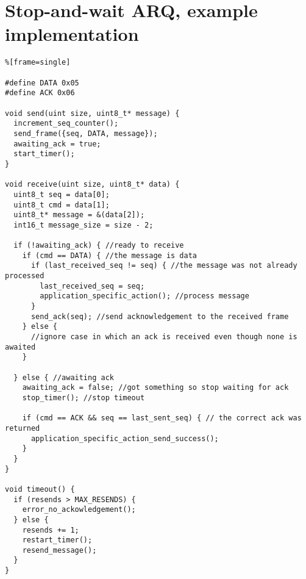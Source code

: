 \documentclass[10pt,a4paper]{article}
\begin{document}
\section{Stop-and-wait ARQ, example implementation} \label{sec:example}
\lstset{language=c}
\begin{lstlisting}%[frame=single]

#define DATA 0x05
#define ACK 0x06

void send(uint size, uint8_t* message) {
  increment_seq_counter();
  send_frame({seq, DATA, message});
  awaiting_ack = true;
  start_timer();
}

void receive(uint size, uint8_t* data) {
  uint8_t seq = data[0];
  uint8_t cmd = data[1];
  uint8_t* message = &(data[2]);
  int16_t message_size = size - 2;
    
  if (!awaiting_ack) { //ready to receive
    if (cmd == DATA) { //the message is data
      if (last_received_seq != seq) { //the message was not already processed
        last_received_seq = seq;
        application_specific_action(); //process message
      } 
      send_ack(seq); //send acknowledgement to the received frame
    } else {
      //ignore case in which an ack is received even though none is awaited
    }
      
  } else { //awaiting ack
    awaiting_ack = false; //got something so stop waiting for ack
    stop_timer(); //stop timeout
    
    if (cmd == ACK && seq == last_sent_seq) { // the correct ack was returned
      application_specific_action_send_success();
    }
  }
}

void timeout() {
  if (resends > MAX_RESENDS) {
    error_no_ackowledgement();
  } else {
    resends += 1;
    restart_timer();
    resend_message();
  }
}
\end{lstlisting}



% 

%
%
\end{document}
